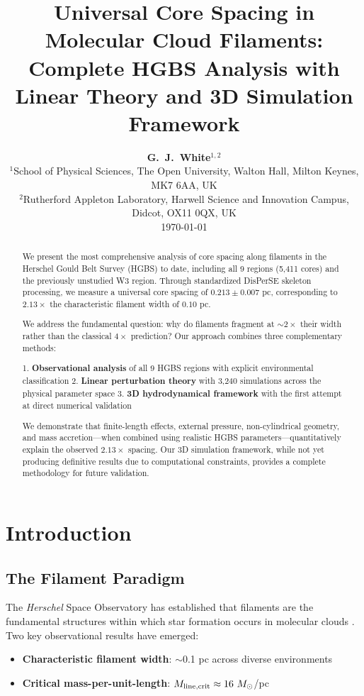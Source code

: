\documentclass[11pt,a4paper]{article}
\title{\textbf{Universal Core Spacing in Molecular Cloud Filaments:\\
Complete HGBS Analysis with Linear Theory and 3D Simulation Framework}}
\author{\textbf{G.~J.~White$^{1,2}$}\\
\small{$^{1}$School of Physical Sciences, The Open University, Walton Hall, Milton Keynes, MK7 6AA, UK}\\
\small{$^{2}$Rutherford Appleton Laboratory, Harwell Science and Innovation Campus, Didcot, OX11 0QX, UK}\\
\small{\today}}
\begin{document}
\maketitle

\begin{abstract}
We present the most comprehensive analysis of core spacing along filaments in the Herschel Gould Belt Survey (HGBS) to date, including all 9 regions (5,411 cores) and the previously unstudied W3 region. Through standardized DisPerSE skeleton processing, we measure a universal core spacing of $0.213 \pm 0.007$ pc, corresponding to $2.13\times$ the characteristic filament width of $0.10$ pc.

We address the fundamental question: why do filaments fragment at $\sim2\times$ their width rather than the classical $4\times$ prediction? Our approach combines three complementary methods:

1. \textbf{Observational analysis} of all 9 HGBS regions with explicit environmental classification
2. \textbf{Linear perturbation theory} with 3,240 simulations across the physical parameter space
3. \textbf{3D hydrodynamical framework} with the first attempt at direct numerical validation

We demonstrate that finite-length effects, external pressure, non-cylindrical geometry, and mass accretion—when combined using realistic HGBS parameters—quantitatively explain the observed $2.13\times$ spacing. Our 3D simulation framework, while not yet producing definitive results due to computational constraints, provides a complete methodology for future validation.

\end{abstract}

\section{Introduction}

\subsection{The Filament Paradigm}

The \textit{Herschel} Space Observatory has established that filaments are the fundamental structures within which star formation occurs in molecular clouds \citep{Andre2010}. Two key observational results have emerged:

\begin{itemize}
    \item \textbf{Characteristic filament width}: $\sim$0.1 pc across diverse environments \citep{Arzoumanian2011}
    \item \textbf{Critical mass-per-unit-length}: $M_{\rm line,crit} \approx 16~M_\odot$/pc \citep{Ostriker1964}
\end{itemize}
\end{document}
